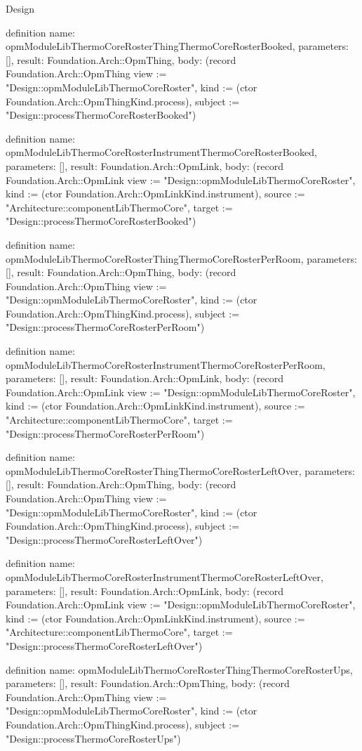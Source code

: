 \begin{lexlean}{Design}
\begin{semanticmodule}
definition{
  name: opmModuleLibThermoCoreRosterThingThermoCoreRosterBooked,
  parameters: [],
  result: Foundation.Arch::OpmThing,
  body: (record Foundation.Arch::OpmThing {view := "Design::opmModuleLibThermoCoreRoster", kind := (ctor Foundation.Arch::OpmThingKind.process), subject := "Design::processThermoCoreRosterBooked"})
}

definition{
  name: opmModuleLibThermoCoreRosterInstrumentThermoCoreRosterBooked,
  parameters: [],
  result: Foundation.Arch::OpmLink,
  body: (record Foundation.Arch::OpmLink {view := "Design::opmModuleLibThermoCoreRoster", kind := (ctor Foundation.Arch::OpmLinkKind.instrument), source := "Architecture::componentLibThermoCore", target := "Design::processThermoCoreRosterBooked"})
}

definition{
  name: opmModuleLibThermoCoreRosterThingThermoCoreRosterPerRoom,
  parameters: [],
  result: Foundation.Arch::OpmThing,
  body: (record Foundation.Arch::OpmThing {view := "Design::opmModuleLibThermoCoreRoster", kind := (ctor Foundation.Arch::OpmThingKind.process), subject := "Design::processThermoCoreRosterPerRoom"})
}

definition{
  name: opmModuleLibThermoCoreRosterInstrumentThermoCoreRosterPerRoom,
  parameters: [],
  result: Foundation.Arch::OpmLink,
  body: (record Foundation.Arch::OpmLink {view := "Design::opmModuleLibThermoCoreRoster", kind := (ctor Foundation.Arch::OpmLinkKind.instrument), source := "Architecture::componentLibThermoCore", target := "Design::processThermoCoreRosterPerRoom"})
}

definition{
  name: opmModuleLibThermoCoreRosterThingThermoCoreRosterLeftOver,
  parameters: [],
  result: Foundation.Arch::OpmThing,
  body: (record Foundation.Arch::OpmThing {view := "Design::opmModuleLibThermoCoreRoster", kind := (ctor Foundation.Arch::OpmThingKind.process), subject := "Design::processThermoCoreRosterLeftOver"})
}

definition{
  name: opmModuleLibThermoCoreRosterInstrumentThermoCoreRosterLeftOver,
  parameters: [],
  result: Foundation.Arch::OpmLink,
  body: (record Foundation.Arch::OpmLink {view := "Design::opmModuleLibThermoCoreRoster", kind := (ctor Foundation.Arch::OpmLinkKind.instrument), source := "Architecture::componentLibThermoCore", target := "Design::processThermoCoreRosterLeftOver"})
}

definition{
  name: opmModuleLibThermoCoreRosterThingThermoCoreRosterUps,
  parameters: [],
  result: Foundation.Arch::OpmThing,
  body: (record Foundation.Arch::OpmThing {view := "Design::opmModuleLibThermoCoreRoster", kind := (ctor Foundation.Arch::OpmThingKind.process), subject := "Design::processThermoCoreRosterUps"})
}


\end{semanticmodule}
\end{lexlean}
